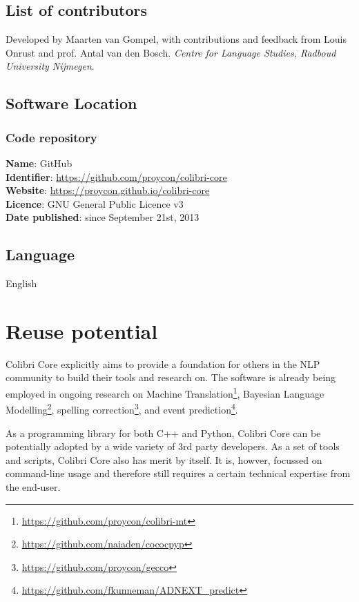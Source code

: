 \documentclass[a4paper,12pt]{article}
\begin{document}
\subsection{List of contributors}

Developed by Maarten van Gompel, with contributions and feedback from Louis
Onrust and prof. Antal van den Bosch. \emph{Centre for Language Studies, Radboud
University Nijmegen}.

\subsection{Software Location}

\subsubsection{Code repository}

\begin{addmargin}[2em]{2em}
\textbf{Name}: GitHub \\
\textbf{Identifier}: \url{https://github.com/proycon/colibri-core} \\
\textbf{Website}: \url{https://proycon.github.io/colibri-core} \\
\textbf{Licence}: GNU General Public Licence v3 \\
\textbf{Date published}: since September 21st, 2013 \\
\end{addmargin}

\subsection{Language}

English


\section{Reuse potential}

Colibri Core explicitly aims to provide a foundation for others in the NLP
community to build their tools and research on. The software is already being
employed in ongoing research on Machine
Translation\footnote{\url{https://github.com/proycon/colibri-mt}}, Bayesian Language
Modelling\footnote{\url{https://github.com/naiaden/cococpyp}}, spelling
correction\footnote{\url{https://github.com/proycon/gecco}}, and event
prediction\footnote{\url{https://github.com/fkunneman/ADNEXT\_predict}}.

As a programming library for both C++ and Python, Colibri Core can be
potentially adopted by a wide variety of 3rd party developers. As a set of
tools and scripts, Colibri Core also has merit by itself. It is, howver,
focussed on command-line usage and therefore still requires a certain technical
expertise from the end-user.
\end{document}
